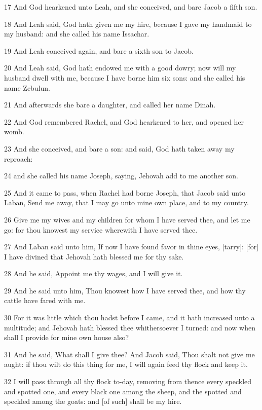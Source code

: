 \par 17 And God hearkened unto Leah, and she conceived, and bare Jacob a fifth son.
\par 18 And Leah said, God hath given me my hire, because I gave my handmaid to my husband: and she called his name Issachar.
\par 19 And Leah conceived again, and bare a sixth son to Jacob.
\par 20 And Leah said, God hath endowed me with a good dowry; now will my husband dwell with me, because I have borne him six sons: and she called his name Zebulun.
\par 21 And afterwards she bare a daughter, and called her name Dinah.
\par 22 And God remembered Rachel, and God hearkened to her, and opened her womb.
\par 23 And she conceived, and bare a son: and said, God hath taken away my reproach:
\par 24 and she called his name Joseph, saying, Jehovah add to me another son.
\par 25 And it came to pass, when Rachel had borne Joseph, that Jacob said unto Laban, Send me away, that I may go unto mine own place, and to my country.
\par 26 Give me my wives and my children for whom I have served thee, and let me go: for thou knowest my service wherewith I have served thee.
\par 27 And Laban said unto him, If now I have found favor in thine eyes, [tarry]: [for] I have divined that Jehovah hath blessed me for thy sake.
\par 28 And he said, Appoint me thy wages, and I will give it.
\par 29 And he said unto him, Thou knowest how I have served thee, and how thy cattle have fared with me.
\par 30 For it was little which thou hadst before I came, and it hath increased unto a multitude; and Jehovah hath blessed thee whithersoever I turned: and now when shall I provide for mine own house also?
\par 31 And he said, What shall I give thee? And Jacob said, Thou shalt not give me aught: if thou wilt do this thing for me, I will again feed thy flock and keep it.
\par 32 I will pass through all thy flock to-day, removing from thence every speckled and spotted one, and every black one among the sheep, and the spotted and speckled among the goats: and [of such] shall be my hire.
